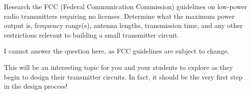 

Research the FCC (Federal Communication Commission) guidelines on low-power radio transmitters requiring no licenses.  Determine what the maximum power output is, frequency range(s), antenna lengths, transmission time, and any other restrictions relevant to building a small transmitter circuit.







I cannot answer the question here, as FCC guidelines are subject to change.







This will be an interesting topic for you and your students to explore as they begin to design their transmitter circuits.  In fact, it should be the very first step in the design process!




